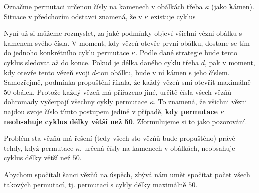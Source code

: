 Označme permutaci určenou čísly na kamenech v obálkách třeba $\kappa$ (jako
\textbf{k}ámen). Situace v předchozím odstavci znamená, že v $\kappa$ existuje
cyklus
\begin{center}
\end{center}

Nyní už si můžeme rozmyslet, za jaké podmínky objeví všichni vězni obálku s
kamenem svého čísla. V moment, kdy vězeň otevře první obálku, dostane se tím do
jednoho konkrétního cyklu permutace $\kappa$. Podle dané strategie bude tento
cyklus sledovat až do konce. Pokud je délka daného cyklu třeba $d$, pak v
moment, kdy otevře tento vězeň svoji $d$-tou obálku, bude v ní kámen s jeho
číslem. Samozřejmě, podmínka propuštění říkala, že každý vězeň smí otevřít
maximálně $50$ obálek. Protože každý vězeň má přiřazeno jiné, určitě čísla všech
vězňů dohromady vyčerpají všechny cykly permutace $\kappa$. To znamená, že
všichni vězni najdou svoje číslo tímto postupem jedině v případě, \textbf{kdy
permutace $\kappa$ neobsahuje cyklus délky větší než 50}. Zformulujeme si to
jako pozorování.

\begin{observation}
 Problém sta vězňů má řešení (tedy všech sto vězňů bude propuštěno) právě tehdy,
 když permutace $\kappa$, určená čísly na kamenech v obálkách, neobsahuje cyklus
 délky větší než $50$.
\end{observation}

Abychom spočítali šanci vězňů na úspěch, zbývá nám umět spočítat počet všech
takových permutací, tj. permutací s cykly délky maximálně $50$.

